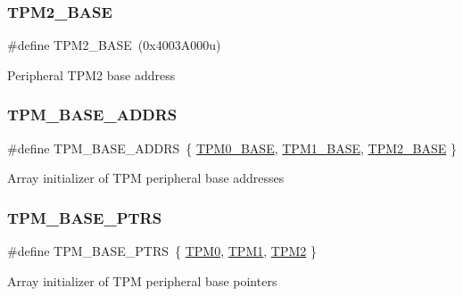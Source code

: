\subsubsection{\texorpdfstring{TPM2\_BASE}{TPM2\_BASE}}
{\footnotesize\ttfamily \#define T\+P\+M2\+\_\+\+B\+A\+SE~(0x4003\+A000u)}

Peripheral T\+P\+M2 base address \mbox{\label{group___t_p_m___peripheral___access___layer_ga0087611419dac57b62b50b4fb052ce37}} 
\subsubsection{\texorpdfstring{TPM\_BASE\_ADDRS}{TPM\_BASE\_ADDRS}}
{\footnotesize\ttfamily \#define T\+P\+M\+\_\+\+B\+A\+S\+E\+\_\+\+A\+D\+D\+RS~\{ \mbox{\hyperlink{group___t_p_m___peripheral___access___layer_gafce6fdf5fb48d6c6b77a8c5a86ae50c2}{T\+P\+M0\+\_\+\+B\+A\+SE}}, \mbox{\hyperlink{group___t_p_m___peripheral___access___layer_ga563e0e90d795a6083656fd2d61c0f694}{T\+P\+M1\+\_\+\+B\+A\+SE}}, \mbox{\hyperlink{group___t_p_m___peripheral___access___layer_gac3255fe3941602acc3b942bb6d885611}{T\+P\+M2\+\_\+\+B\+A\+SE}} \}}

Array initializer of T\+PM peripheral base addresses \mbox{\label{group___t_p_m___peripheral___access___layer_ga1d61ed554c056d8f63d1dbcc7ce05e62}} 
\subsubsection{\texorpdfstring{TPM\_BASE\_PTRS}{TPM\_BASE\_PTRS}}
{\footnotesize\ttfamily \#define T\+P\+M\+\_\+\+B\+A\+S\+E\+\_\+\+P\+T\+RS~\{ \mbox{\hyperlink{group___t_p_m___peripheral___access___layer_ga255cfcfa3e71e5e8bc0f8eb3272de220}{T\+P\+M0}}, \mbox{\hyperlink{group___t_p_m___peripheral___access___layer_ga2e4965bffa80b3aab662e2d60096ae53}{T\+P\+M1}}, \mbox{\hyperlink{group___t_p_m___peripheral___access___layer_ga833a0146c6466718ff4e2ffa215355ea}{T\+P\+M2}} \}}

Array initializer of T\+PM peripheral base pointers \mbox{\label{group___t_p_m___peripheral___access___layer_ga00286d54e4f8b9944c9fb9fc5acf54ba}} 
